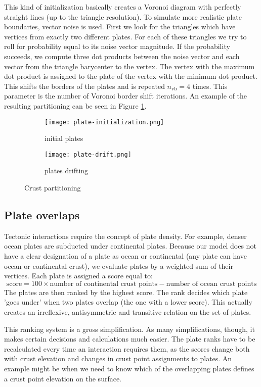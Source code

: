 This kind of initialization basically creates a Voronoi diagram with perfectly straight lines (up to the triangle resolution). To simulate more realistic plate boundaries, vector noise is used. First we look for the triangles which have vertices from exactly two different plates. For each of these triangles we try to roll for probability equal to its noise vector magnitude. If the probability succeeds, we compute three dot products between the noise vector and each vector from the triangle barycenter to the vertex. The vertex with the maximum dot product is assigned to the plate of the vertex with the minimum dot product. This shifts the borders of the plates and is repeated $n_{\mbox{vb}}=4$ times. This parameter is the number of Voronoi border shift iterations. An example of the resulting partitioning can be seen in Figure \ref{fig:initial-plates}.
\begin{figure}[ht]
\centering
\begin{subfigure}{7cm}
\texttt{[image: plate-initialization.png]}
\caption{initial plates}
\label{fig:initial-plates}
\end{subfigure}
\hspace*{1cm}
\begin{subfigure}{7cm}
\texttt{[image: plate-drift.png]}
\caption{plates drifting}
\label{fig:plates-drifting}
\end{subfigure}
\caption{Crust partitioning}
\label{fig:crust-partitioning}
\end{figure}
\subsection{Plate overlaps}
Tectonic interactions require the concept of plate density. For example, denser ocean plates are subducted under continental plates. Because our model does not have a clear designation of a plate as ocean or continental (any plate can have ocean or continental crust), we evaluate plates by a weighted sum of their vertices. Each plate is assigned a score equal to:
$$\mbox{score}=100\times\mbox{number of continental crust points}-\mbox{number of ocean crust points}$$
The plates are then ranked by the highest score. The rank decides which plate 'goes under' when two plates overlap (the one with a lower score). This actually creates an irreflexive, antisymmetric and transitive relation on the set of plates.

This ranking system is a gross simplification. As many simplifications, though, it makes certain decisions and calculations much easier. The plate ranks have to be recalculated every time an interaction requires them, as the scores change both with crust elevation and changes in crust point assignments to plates. An example might be when we need to know which of the overlapping plates defines a crust point elevation on the surface.
